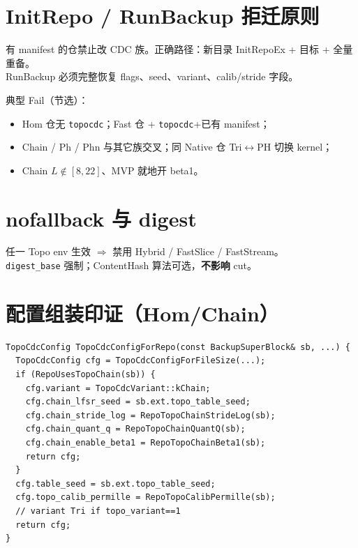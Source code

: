 \section{InitRepo / RunBackup 拒迁原则}

\begin{structbox}[绝对禁止就地跨族]
有 manifest 的仓禁止改 CDC 族。正确路径：新目录 InitRepoEx + 目标  + 全量重备。\\
RunBackup 必须完整恢复 flags、seed、variant、calib/stride 字段。
\end{structbox}

典型 Fail（节选）：
\begin{itemize}[nosep]
  \item Hom 仓无 \texttt{topocdc}；Fast 仓 + \texttt{topocdc}+已有 manifest；
  \item Chain / Ph / Phn 与其它族交叉；同 Native 仓 Tri$\leftrightarrow$PH 切换 kernel；
  \item Chain $L\notin[8,22]$、MVP 就地开 beta1。
\end{itemize}

\section{nofallback 与 digest}

任一 Topo env 生效 $\Rightarrow$ 禁用 Hybrid / FastSlice / FastStream。\\
\texttt{digest\_base} 强制；ContentHash 算法可选，\textbf{不影响} cut。

\section{配置组装印证（Hom/Chain）}

\begin{lstlisting}[caption={TopoCdcConfigForRepo 摘要},label={lst:cfg-for-repo}]
TopoCdcConfig TopoCdcConfigForRepo(const BackupSuperBlock& sb, ...) {
  TopoCdcConfig cfg = TopoCdcConfigForFileSize(...);
  if (RepoUsesTopoChain(sb)) {
    cfg.variant = TopoCdcVariant::kChain;
    cfg.chain_lfsr_seed = sb.ext.topo_table_seed;
    cfg.chain_stride_log = RepoTopoChainStrideLog(sb);
    cfg.chain_quant_q = RepoTopoChainQuantQ(sb);
    cfg.chain_enable_beta1 = RepoTopoChainBeta1(sb);
    return cfg;
  }
  cfg.table_seed = sb.ext.topo_table_seed;
  cfg.topo_calib_permille = RepoTopoCalibPermille(sb);
  // variant Tri if topo_variant==1
  return cfg;
}
\end{lstlisting}
